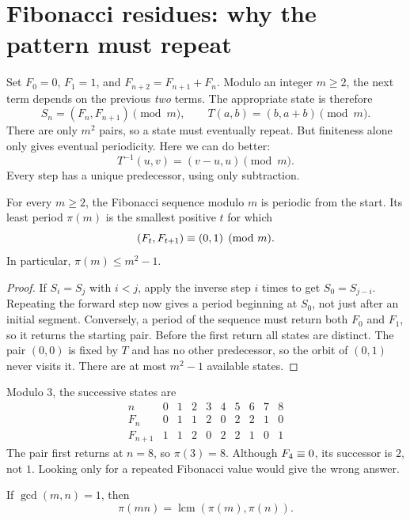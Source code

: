 \section{Fibonacci residues: why the pattern must repeat}
\label{sec:fibonacci-periodicity}

Set $F_0=0$, $F_1=1$, and $F_{n+2}=F_{n+1}+F_n$. Modulo an integer
$m\ge2$, the next term depends on the previous \emph{two} terms.
The appropriate state is therefore
\[
 S_n=(F_n,F_{n+1})\pmod m,
 \qquad T(a,b)=(b,a+b)\pmod m.
\]
There are only $m^2$ pairs, so a state must eventually repeat.
But finiteness alone only gives eventual periodicity. Here we can do better:
\[
 T^{-1}(u,v)=(v-u,u)\pmod m.
\]
Every step has a unique predecessor, using only subtraction.

\begin{theorem}
For every $m\ge2$, the Fibonacci sequence modulo $m$ is periodic from
the start. Its least period $\pi(m)$ is the smallest positive $t$ for which
\[
 (F_t,F_{t+1})\equiv(0,1)\pmod m.
\]
In particular, $\pi(m)\le m^2-1$.
\end{theorem}

\begin{proof}
If $S_i=S_j$ with $i<j$, apply the inverse step $i$ times to get
$S_0=S_{j-i}$. Repeating the forward step now gives a period beginning
at $S_0$, not just after an initial segment. Conversely, a period of the
sequence must return both $F_0$ and $F_1$, so it returns the starting pair.
Before the first return all states are distinct. The pair $(0,0)$ is fixed
by $T$ and has no other predecessor, so the orbit of $(0,1)$ never visits
it. There are at most $m^2-1$ available states.
\end{proof}

\begin{example}
Modulo $3$, the successive states are
\[
\begin{array}{c|rrrrrrrrr}
n&0&1&2&3&4&5&6&7&8\\\hline
F_n&0&1&1&2&0&2&2&1&0\\
F_{n+1}&1&1&2&0&2&2&1&0&1
\end{array}
\]
The pair first returns at $n=8$, so $\pi(3)=8$.
Although $F_4\equiv0$, its successor is $2$, not $1$.
Looking only for a repeated Fibonacci value would give the wrong answer.
\end{example}

\begin{proposition}
If $\gcd(m,n)=1$, then
\[
 \pi(mn)=\operatorname{lcm}(\pi(m),\pi(n)).
\]
\end{proposition}

